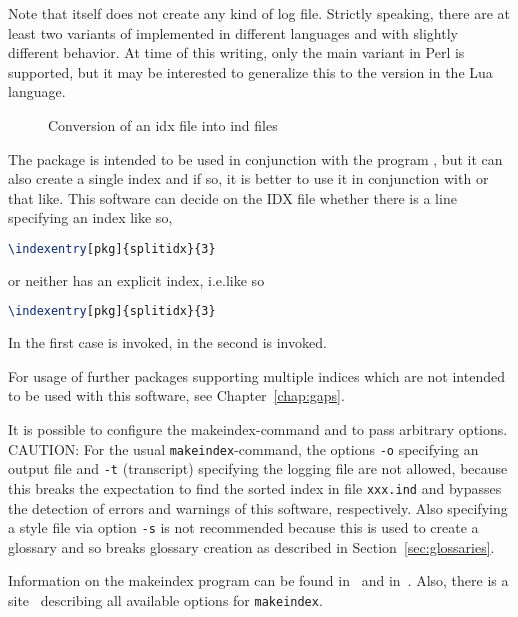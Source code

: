 Note that  itself does not create any kind of log file. 
Strictly speaking, there are at least two variants of  
implemented in different languages and with slightly different behavior. 
At time of this writing, only the main variant in Perl is supported, 
but it may be interested to generalize this to the version in the Lua language. 

\begin{figure}[htb]
  \centering
  \caption{\label{fig:idx2indSplit}Conversion of an \gls{idx} file into ind files}
  \end{figure}
  \medskip




The package  is intended to be used 
in conjunction with the program , 
but it can also create a single index and if so, it is better to use it in conjunction with 
 or that like. 
This software can decide on the IDX file whether there is a line specifying an index like so, 
%
\begin{lstlisting}[language=TeX]
  \indexentry[pkg]{splitidx}{3}
\end{lstlisting}
%
or neither has an explicit index, i.e.\@ like so 
%
\begin{lstlisting}[language=TeX]
  \indexentry[pkg]{splitidx}{3}
\end{lstlisting}
%
In the first case  is invoked, in the second  is invoked. 
\medskip


For usage of further packages supporting multiple indices 
which are not intended to be used with this software, 
see Chapter~\ref{chap:gaps}. 


It is possible to configure the makeindex-command 
and to pass arbitrary options. 
CAUTION\@: For the usual \texttt{makeindex}-command, 
the options \texttt{-o} specifying an output file 
and \texttt{-t} (transcript) specifying the logging file are not allowed, 
because this breaks the expectation to find the sorted index 
in file \texttt{xxx.ind} 
and bypasses the detection of errors and warnings of this software, 
respectively. 
Also specifying a style file via option \texttt{-s} 
is not recommended because this is used to create a glossary 
and so breaks glossary creation 
as described in Section~\ref{sec:glossaries}. 

Information on the makeindex program can be found in~\cite{MkIdxMoe} 
and in~\cite{MkIdxLam}. 
Also, there is a site~\cite{MakeIdxOpts} 
describing all available options for \texttt{makeindex}. 

